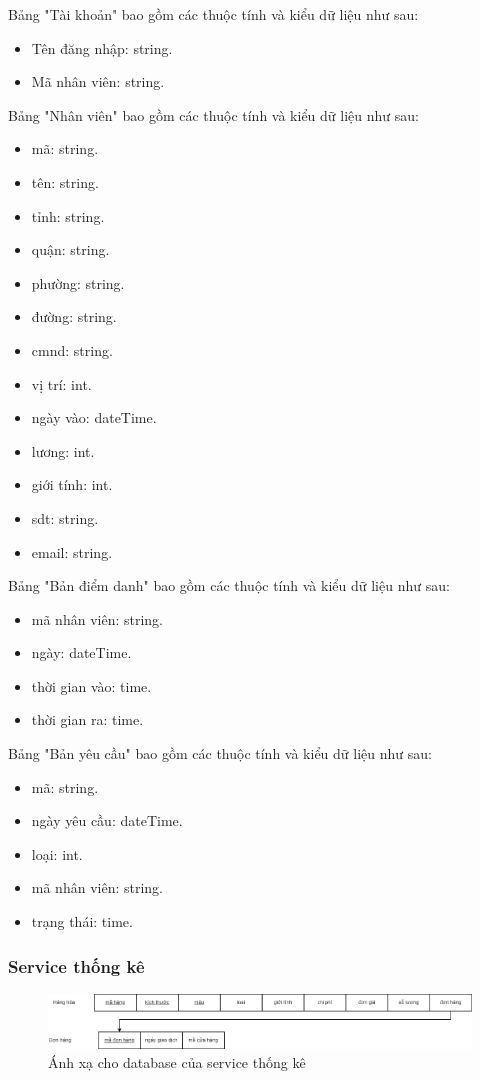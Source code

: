 Bảng "Tài khoản" bao gồm các thuộc tính và kiểu dữ liệu như sau:
\begin{itemize}
	\item Tên đăng nhập: string.
	\item Mã nhân viên: string.
\end{itemize}

Bảng "Nhân viên" bao gồm các thuộc tính và kiểu dữ liệu như sau:
\begin{itemize}
	\item mã: string.
	\item tên: string.
	\item tỉnh: string.
	\item quận: string.
	\item phường: string.
	\item đường: string.
	\item cmnd: string.
	\item vị trí: int.
	\item ngày vào: dateTime.
	\item lương: int.
	\item giới tính: int. 
	\item sdt: string.  
	\item email: string. 
\end{itemize}

Bảng "Bản điểm danh" bao gồm các thuộc tính và kiểu dữ liệu như sau:
\begin{itemize}
	\item mã nhân viên: string.
	\item ngày: dateTime.
	\item thời gian vào: time.
	\item thời gian ra: time.
\end{itemize}

Bảng "Bản yêu cầu" bao gồm các thuộc tính và kiểu dữ liệu như sau:
\begin{itemize}
	\item mã: string.
	\item ngày yêu cầu: dateTime.
	\item loại: int.
	\item mã nhân viên: string.
	\item trạng thái: time.
\end{itemize}


\subsubsection{Service thống kê}
\begin{figure}[!htp]
	\begin{center}
		\includegraphics[width=1\textwidth]{img/database/mapping/Statistic.png}
		\newline
		\caption{Ánh xạ cho database của service thống kê}
	\end{center}
\end{figure}

